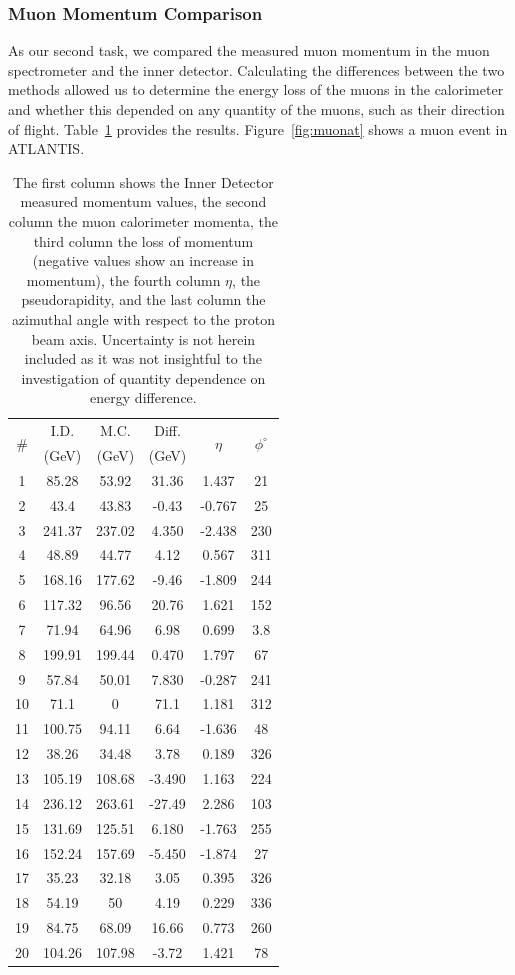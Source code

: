 \documentclass[twocolumn]{article}
\begin{document}
\subsubsection{Muon Momentum Comparison}
As our second task, we compared the measured muon momentum in the muon spectrometer and the inner detector. Calculating the differences between the two methods allowed us to determine the energy loss of the muons in the calorimeter and whether this depended on any quantity of the muons, such as their direction of flight. Table~\ref{tab:muon} provides the results. Figure~\ref{fig:muonat} shows a muon event in ATLANTIS.
\begin{table} [!h]
\centering
\begin{tabular}{|c|c|c|c|c|c|}
\hline
\multirow{2}{*}{\#} 	& I.D.		& M.C. 		& Diff. 	& \multirow{2}{*}{$\eta$} & \multirow{2}{*}{$\phi^{\circ}$}\\
					& (GeV)	& (GeV)	& (GeV)	&	&\\
\hline
1&	85.28&		53.92&		31.36&		1.437&	21\\\hline
2&	43.4&		43.83&		-0.43&		-0.767&	25\\\hline
3&	241.37&		237.02&		4.350&		-2.438&	230\\\hline
4&	48.89&		44.77&		4.12&		0.567&	311\\\hline
5&	168.16&		177.62&		-9.46&		-1.809&	244\\\hline
6&	117.32&		96.56&		20.76&		1.621&	152\\\hline
7&	71.94&		64.96&		6.98&		0.699&	3.8\\\hline
8&	199.91&		199.44&		0.470&		1.797&	67\\\hline
9&	57.84&		50.01&		7.830&		-0.287&	241\\\hline
10&	71.1&		0&			71.1&		1.181&	312\\\hline
11&	100.75&		94.11&		6.64&		-1.636&	48\\\hline
12&	38.26&		34.48&		3.78&		0.189&	326\\\hline
13&	105.19&		108.68&		-3.490&		1.163&	224\\\hline
14&	236.12&		263.61&		-27.49&		2.286&	103\\\hline
15&	131.69&		125.51&		6.180&		-1.763&	255\\\hline
16&	152.24&		157.69&		-5.450&		-1.874&	27\\\hline
17&	35.23&		32.18&		3.05&		0.395&	326\\\hline
18&	54.19&		50&			4.19&		0.229&	336\\\hline
19&	84.75&		68.09&		16.66&		0.773&	260\\\hline
20&	104.26&		107.98&		-3.72&		1.421&	78\\
\hline
\end{tabular}
\caption{The first column shows the Inner Detector measured momentum values, the second column the muon calorimeter momenta, the third column the loss of momentum (negative values show an increase in momentum), the fourth column $\eta$, the pseudorapidity, and the last column the azimuthal angle with respect to the proton beam axis. Uncertainty is not herein included as it was not insightful to the investigation of quantity dependence on energy difference.}
\label{tab:muon}
\end{table}
\end{document}
